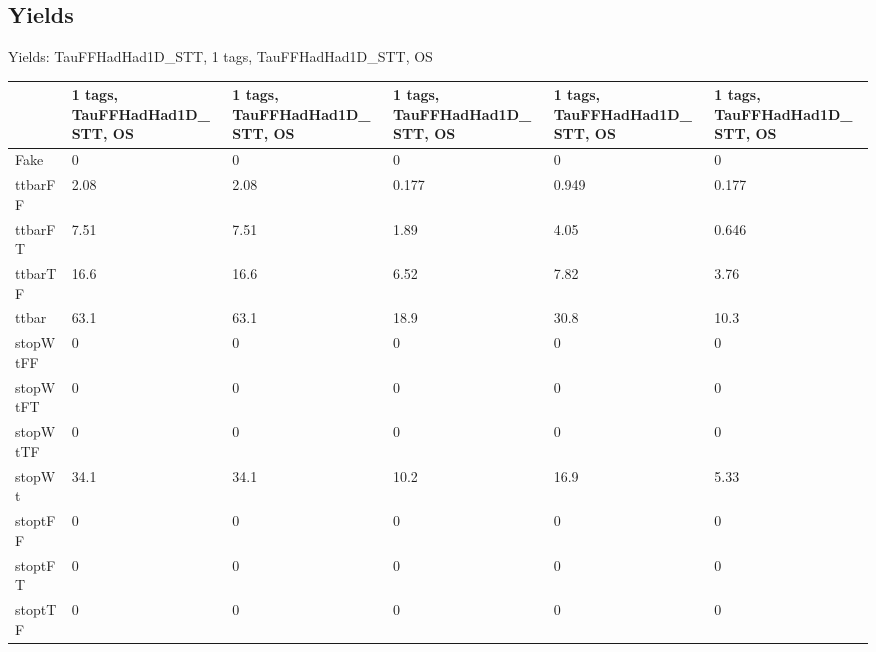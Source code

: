 
\subsection{Yields}

\begin{frame}{Yields: TauFFHadHad1D\_STT, 1 tags, TauFFHadHad1D\_STT, OS}
\begin{center}
  \begin{tabular}{l| >{\centering\let\newline\\\arraybackslash\hspace{0pt}}m{1.4cm}| >{\centering\let\newline\\\arraybackslash\hspace{0pt}}m{1.4cm}| >{\centering\let\newline\\\arraybackslash\hspace{0pt}}m{1.4cm}| >{\centering\let\newline\\\arraybackslash\hspace{0pt}}m{1.4cm}| >{\centering\let\newline\\\arraybackslash\hspace{0pt}}m{1.4cm}}
    & 1 tags, TauFFHadHad1D\_STT, OS & 1 tags, TauFFHadHad1D\_STT, OS & 1 tags, TauFFHadHad1D\_STT, OS & 1 tags, TauFFHadHad1D\_STT, OS & 1 tags, TauFFHadHad1D\_STT, OS \\
 \hline \hline
    Fake& 0 & 0 & 0 & 0 & 0 \\
 \hline
    ttbarFF& 2.08 & 2.08 & 0.177 & 0.949 & 0.177 \\
 \hline
    ttbarFT& 7.51 & 7.51 & 1.89 & 4.05 & 0.646 \\
 \hline
    ttbarTF& 16.6 & 16.6 & 6.52 & 7.82 & 3.76 \\
 \hline
    ttbar& 63.1 & 63.1 & 18.9 & 30.8 & 10.3 \\
 \hline
    stopWtFF& 0 & 0 & 0 & 0 & 0 \\
 \hline
    stopWtFT& 0 & 0 & 0 & 0 & 0 \\
 \hline
    stopWtTF& 0 & 0 & 0 & 0 & 0 \\
 \hline
    stopWt& 34.1 & 34.1 & 10.2 & 16.9 & 5.33 \\
 \hline
    stoptFF& 0 & 0 & 0 & 0 & 0 \\
 \hline
    stoptFT& 0 & 0 & 0 & 0 & 0 \\
 \hline
    stoptTF& 0 & 0 & 0 & 0 & 0 \\

\end{tabular}
\end{center}
\end{frame}
